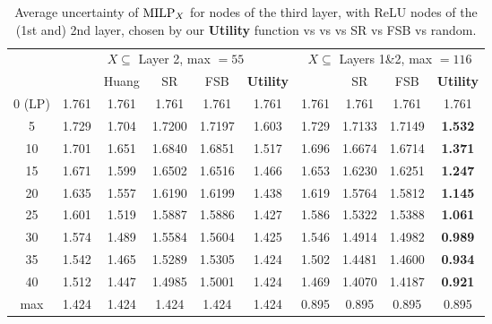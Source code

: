 {\begin{table}[h!]	
	\centering
	\begin{tabular}{|c||c|c|c|c|c||c|c|c|c|}
		\hline
			&\multicolumn{5}{c||}{$X \subseteq$ Layer 2, max $=55$}&\multicolumn{4}{c|}{$X \subseteq$ Layers 1\&2, max $=116$} \\\cline{2-10}
		\text{$|X|$}  & \text{Random} & Huang &SR&FSB& \bf Utility& \text{Random} & SR & FSB &\bf Utility\\ \hline
		\hline
		0  (LP) &   1.761  &1.761&1.761&1.761& 1.761 & 1.761  &  1.761& 1.761 & 1.761\\ \hline \hline
		5  &   1.729&1.704 &1.7200&1.7197& 1.603&  1.729& 1.7133 & 1.7149 & \bf 1.532 \\ \hline
		10  &  1.701 &  1.651 &1.6840&1.6851&1.517& 1.696 & 1.6674& 1.6714 & \bf  1.371\\ \hline
		15  & 1.671 &  1.599 &1.6502& 1.6516&1.466&  1.653& 1.6230& 1.6251 & \bf  1.247\\ \hline
		20  &  1.635 & 1.557&1.6190&1.6199&1.438 & 1.619 &1.5764 & 1.5812 & \bf  1.145\\ \hline
		25  &  1.601 & 1.519 &1.5887&1.5886&1.427&  1.586 &1.5322 & 1.5388 & \bf 1.061\\ \hline
		30  & 1.574 & 1.489 &1.5584&1.5604&1.425& 1.546 &  1.4914& 1.4982 & \bf  0.989 \\ \hline
		35  &  1.542 & 1.465&1.5289&1.5305&1.424 & 1.502 & 1.4481 & 1.4600 & \bf 0.934 \\ \hline
		40  & 1.512 & 1.447 &1.4985&1.5001&1.424& 1.469 & 1.4070& 1.4187 & \bf 0.921 \\ \hline \hline
		max & 1.424  &1.424&1.424&1.424& 1.424 & 0.895 & 0.895 & 0.895 & 0.895   \\ \hline
	\end{tabular}
	\caption{Average uncertainty of ${\textrm{MILP}}_X$ for nodes of the third layer, with ReLU nodes of the (1st and) 2nd layer, chosen by our {\bf Utility} function vs \cite{DivideAndSlide} vs vs SR vs FSB vs random.}
	\label{tab:example1}
\end{table}



}
